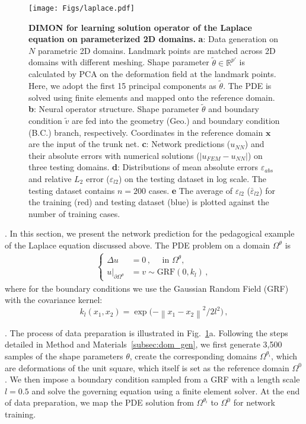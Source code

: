 \documentclass[review]{elsarticle}
\def\Omegatheta{{\Omega^\theta}}
\def\Omegathetai{{\Omega^{\theta_i}}}
\def\refd{0}
\def\Omegaref{{\Omega^\refd}}
\newcommand\norm[1]{\left\lVert#1\right\rVert}
\newcommand{\MM}[1]{\textcolor{purple}{#1}}
\begin{document}
\begin{figure}
    \centering
	\texttt{[image: Figs/laplace.pdf]} 
    \caption{\textbf{DIMON for learning solution operator of the Laplace equation on parameterized 2D domains.} {\bf a}: Data generation on $N$ parametric 2D domains. Landmark points are matched across 2D domains with different meshing. Shape parameter $\tilde{\theta}\in \mathbb{R}^{p'}$ is calculated by PCA on the deformation field at the landmark points. Here, we adopt the first 15 principal components as $\tilde{\theta}$. The PDE is solved using finite elements and mapped onto the reference domain. {\bf b}: Neural operator structure. Shape parameter $\tilde{\theta}$ and boundary condition $\tilde{v}$ are fed into the geometry (Geo.) and boundary condition (B.C.) branch, respectively. Coordinates in the reference domain $\mathbf{x}$ are the input of the trunk net. {\bf c}: Network predictions ($u_{NN}$) and their absolute errors with numerical solutions ($|u_{FEM} - u_{NN}|$) on three testing domains. {\bf d}: Distributions of mean absolute errors $\varepsilon_{abs}$
    and relative $L_{2}$ error ($\varepsilon_{l2}$) on the testing dataset in log scale. The testing dataset contains $n=200$ cases. {\bf e} The average of $\varepsilon_{l2}$ ($\bar \varepsilon_{l2}$) for the training (red) and testing dataset (blue) is plotted against the number of training cases. %
    }
    \label{fig:laplace}
\end{figure}

. In this section, we present the network prediction for the pedagogical example of the Laplace equation discussed above. The PDE problem on a domain $\Omegatheta$ is
\begin{align*}
\begin{cases}
    \Delta u &= 0\,,\quad\text{ in } \Omegatheta, \\
    u|_{\partial\Omegatheta} &= v \sim \text{GRF}(0, k_{l})\,,
\end{cases}
\end{align*}
where for the boundary conditions we use the Gaussian Random Field (GRF) with the covariance kernel:
\begin{equation}
    k_{l}(x_{1}, x_{2}) = \exp{(-\norm{x_{1}-x_{2}}}^{2}/2l^{2})\,,
\end{equation}

. The process of data preparation is illustrated in Fig.~\ref{fig:laplace}a. Following the steps detailed in Method and Materials~\ref{subsec:dom_gen}, we first generate 3,500 samples of the shape parameters $\theta$, create the corresponding domains $\Omegathetai$, which are deformations of the unit square, which itself is set as the reference domain $\Omegaref$. We then impose a boundary condition sampled from a GRF with a length scale $l=0.5$ and solve the governing equation using a finite element solver. At the end of data preparation, we map the PDE solution from $\Omegathetai$ to $\Omegaref$ for network training. 
\end{document}
